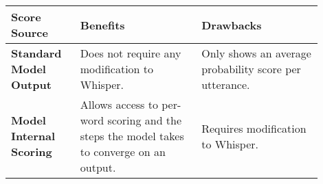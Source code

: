 \begin{table}[h!]
\centering
\begin{tabular}{p{0.2\linewidth}  p{0.35\linewidth}  p{0.35\linewidth}}
\hline
\textbf{Score Source} &
  \textbf{Benefits} &
  \textbf{Drawbacks} \\[0.3cm] \hline
\textbf{Standard Model Output} &
  Does not require any modification to Whisper. &
  Only shows an average probability score per utterance. \\[0.3cm]
\textbf{Model Internal Scoring} &
  Allows access to per-word scoring and the steps the model takes to converge on an output. &
  Requires modification to Whisper. \\ \hline
\end{tabular}
\end{table}
